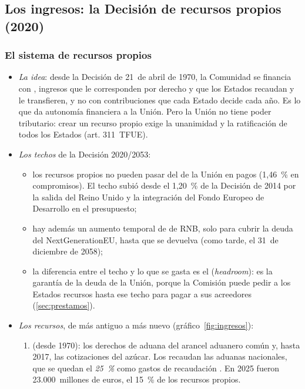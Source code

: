 \documentclass[11pt]{article}
\begin{document}
\subsection{Los ingresos: la Decisión de recursos propios (2020)}\label{sec:ingresos}

\subsubsection{El sistema de recursos propios}\label{sec:recursos}

\begin{itemize}
\item \emph{La idea}: desde la Decisión de 21~de abril de 1970, la Comunidad se financia con , ingresos que le corresponden por derecho y que los Estados recaudan y le transfieren, y no con contribuciones que cada Estado decide cada año. Es lo que da autonomía financiera a la Unión. Pero la Unión no tiene poder tributario: crear un recurso propio exige la unanimidad y la ratificación de todos los Estados (art. 311~TFUE).
\item \emph{Los techos} de la Decisión 2020/2053\nocite{UE2020DRP}:
  \begin{itemize}
  \item los recursos propios no pueden pasar del  de la Unión en pagos (1,46~\% en compromisos). El techo subió desde el 1,20~\% de la Decisión de 2014 por la salida del Reino Unido y la integración del Fondo Europeo de Desarrollo en el presupuesto\nocite{UE2020DRP};
  \item hay además un aumento temporal de  de RNB, solo para cubrir la deuda del NextGenerationEU, hasta que se devuelva (como tarde, el 31~de diciembre de 2058);
  \item la diferencia entre el techo y lo que se gasta es el  (\emph{headroom}): es la garantía de la deuda de la Unión, porque la Comisión puede pedir a los Estados recursos hasta ese techo para pagar a sus acreedores (\ref{sec:prestamos}).
  \end{itemize}
\item \emph{Los recursos}, de más antiguo a más nuevo (gráfico~\ref{fig:ingresos}):
  \begin{enumerate}
  \item {} (desde 1970): los derechos de aduana del arancel aduanero común y, hasta 2017, las cotizaciones del azúcar. Los recaudan las aduanas nacionales, que se quedan el \emph{25~\%} como gastos de recaudación\nocite{UE2020DRP} . En 2025 fueron 23.000~millones de euros, el 15~\% de los recursos propios.

\end{enumerate}
\end{itemize}
\end{document}
